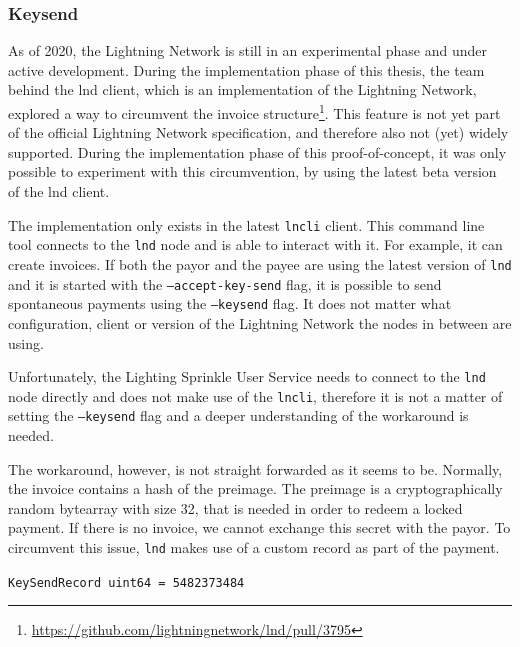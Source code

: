 \subsubsection{Keysend}
\label{sec:keysend}

As of 2020, the Lightning Network is still in an experimental phase and under active development. During the implementation phase of this thesis, the team behind the lnd client, which is an implementation of the Lightning Network, explored a way to circumvent the invoice structure\footnote{\url{https://github.com/lightningnetwork/lnd/pull/3795}}. This feature is not yet part of the official Lightning Network specification, and therefore also not (yet) widely supported. During the implementation phase of this proof-of-concept, it was only possible to experiment with this circumvention, by using the latest beta version of the lnd client. 

The implementation only exists in the latest \texttt{lncli} client. This command line tool connects to the \texttt{lnd} node and is able to interact with it. For example, it can create invoices. If both the payor and the payee are using the latest version of \texttt{lnd} and it is started with the \texttt{--accept-key-send} flag, it is possible to send spontaneous payments using the \texttt{--keysend} flag. It does not matter what configuration, client or version of the Lightning Network the nodes in between are using. 

Unfortunately, the Lighting Sprinkle User Service needs to connect to the \texttt{lnd} node directly and does not make use of the \texttt{lncli}, therefore it is not a matter of setting the \texttt{--keysend} flag and a deeper understanding of the workaround is needed.

The workaround, however, is not straight forwarded as it seems to be. Normally, the invoice contains a hash of the preimage. The preimage is a cryptographically random bytearray with size 32, that is needed in order to redeem a locked payment. If there is no invoice, we cannot exchange this secret with the payor. To circumvent this issue, \texttt{lnd} makes use of a custom record as part of the payment.

\texttt{KeySendRecord uint64 = 5482373484}

